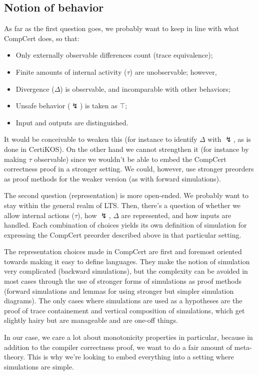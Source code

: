 \documentclass[11pt]{article}
\begin{document}
\subsection{Notion of behavior} %

As far as the first question goes,
we probably want to keep in line with what CompCert does,
so that:
\begin{itemize}
\item Only externally observable differences count (trace equivalence);
\item Finite amounts of internal activity ($\tau$) are unobservable;
  however,
\item Divergence ($\Delta$) is observable,
  and incomparable with other behaviors;
\item Unsafe behavior ($\lightning$) is taken as $\top$;
\item Input and outputs are distinguished.
\end{itemize}
It would be conceivable to weaken this
(for instance to identify $\Delta$ with $\lightning$,
as is done in CertiKOS).
On the other hand we cannot strengthen it
(for instance by making $\tau$ observable)
since we wouldn't be able to embed
the CompCert correctness proof in a stronger setting.
We could, however,
use stronger preorders as proof methods
for the weaker version
(as with forward simulations).

The second question (representation) is more open-ended.
We probably want to stay within the general realm of LTS.
Then, there's a question of
whether we allow internal actions ($\tau$),
how $\lightning$, $\Delta$ are represented,
and how inputs are handled.
Each combination of choices yields
its own definition of simulation for
expressing the CompCert preorder described above
in that particular setting.

The representation choices made in CompCert
are first and foremost oriented towards
making it easy to define languages.
They make the notion of simulation
very complicated (backward simulations),
but the complexity can be avoided in most cases
through the use of stronger forms of simulations
as proof methods
(forward simulations and
lemmas for using stronger but simpler simulation diagrams).
The only cases where simulations are used as a hypotheses are
the proof of trace containement
and vertical composition of simulations,
which get slightly hairy but are manageable
and are one-off things.

In our case,
we care a lot about monotonicity properties in particular,
because in addition to the compiler correctness proof,
we want to do a fair amount of meta-theory.
This is why we're looking to embed everything
into a setting where simulations are simple.
\end{document}

